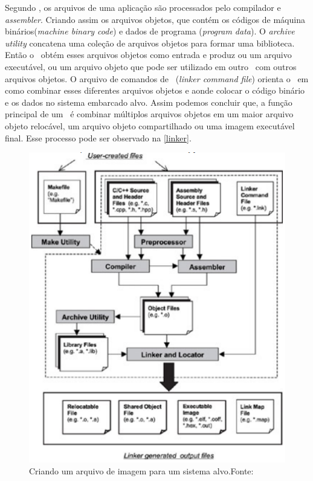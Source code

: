 Segundo , os arquivos de uma aplicação são processados pelo compilador e \textit{assembler}. Criando assim os arquivos objetos, que contém os códigos de máquina binários(\textit{machine binary code}) e dados de programa (\textit{program data}). O \textit{archive utility} concatena uma coleção de arquivos objetos para formar uma biblioteca. Então o \linker\ obtém esses arquivos objetos como entrada e produz ou um arquivo executável, ou um arquivo objeto que pode ser utilizado em outro \linker\ com outros arquivos objetos. O arquivo de comandos de \linker\ (\textit{linker command file}) orienta o \linker\ em como combinar esses diferentes arquivos objetos e aonde colocar o código binário e os dados no sistema embarcado alvo. Assim podemos concluir que, a função principal de um \linker\ é combinar múltiplos arquivos objetos em um maior arquivo objeto relocável, um arquivo objeto compartilhado ou uma imagem executável final. Esse processo pode ser observado na \autoref{linker}.

\begin{figure}[H]
    \scriptsize
     \centering
     \includegraphics[scale=1]{dados/figuras/Linker.png}
     \caption{Criando um arquivo de imagem para um sistema alvo.\newline Fonte:\cite{Qing2003}}
     \label{linker}
\end{figure}

